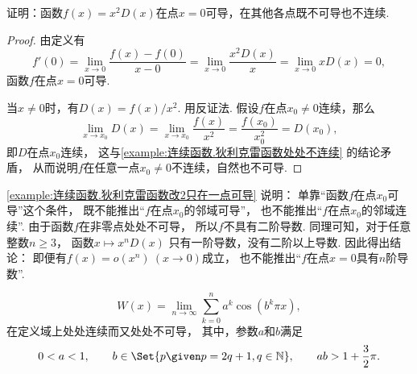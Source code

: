 \begin{example}\label{example:连续函数.狄利克雷函数改2只在一点可导}
证明：函数\(f(x) = x^2 D(x)\)在点\(x=0\)可导，在其他各点既不可导也不连续.
\begin{proof}
由定义有\begin{equation*}
	f'(0) = \lim_{x\to0} \frac{f(x) - f(0)}{x - 0}
	= \lim_{x\to0} \frac{x^2 D(x)}{x}
	= \lim_{x\to0} x D(x)
	= 0,%
\end{equation*}
函数\(f\)在点\(x=0\)可导.

当\(x\neq0\)时，有\(D(x) = f(x) / x^2\).
用反证法.
假设\(f\)在点\(x_0\neq0\)连续，那么\begin{equation*}
	\lim_{x \to x_0} D(x)
	= \lim_{x \to x_0} \frac{f(x)}{x^2}
	= \frac{f(x_0)}{x_0^2}
	= D(x_0),
\end{equation*}
即\(D\)在点\(x_0\)连续，
这与\cref{example:连续函数.狄利克雷函数处处不连续} 的结论矛盾，
从而说明\(f\)在任意一点\(x_0\neq0\)不连续，自然也不可导.
\end{proof}
\end{example}
\begin{remark}
\cref{example:连续函数.狄利克雷函数改2只在一点可导} 说明：
单靠“函数\(f\)在点\(x_0\)可导”这个条件，
既不能推出“\(f\)在点\(x_0\)的邻域可导”，
也不能推出“\(f\)在点\(x_0\)的邻域连续”.
由于函数\(f\)在非零点处处不可导，
所以\(f\)不具有二阶导数.
同理可知，对于任意整数\(n\geq3\)，
函数\(x \mapsto x^n D(x)\)
只有一阶导数，没有二阶以上导数.
因此得出结论：
即便有\(f(x) = o(x^n)\ (x\to0)\)成立，
也不能推出“\(f\)在点\(x=0\)具有\(n\)阶导数”.
\end{remark}

\begin{example}
\begin{equation*}
	W(x) = \lim_{n\to\infty} \sum_{k=0}^n a^k \cos(b^k \pi x),
\end{equation*}在定义域上处处连续而又处处不可导，
其中，参数\(a\)和\(b\)满足\begin{equation*}
	0<a<1,
	\qquad
	b\in\Set{ p \given p = 2q+1, q\in\mathbb{N} },
	\qquad
	ab > 1+\frac{3}{2}\pi.
\end{equation*}
\end{example}

